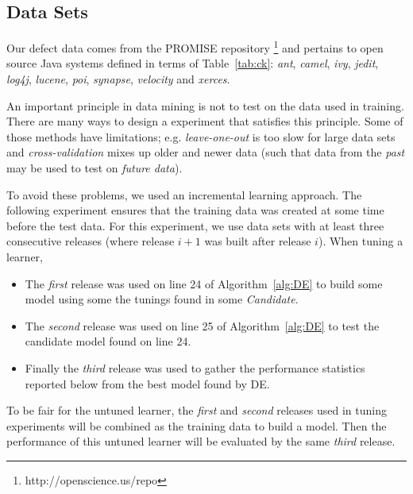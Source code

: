 \documentclass[smallextended]{svjour3}
\newcommand{\bi}{\begin{itemize}[leftmargin=0.4cm]}
\newcommand{\ei}{\end{itemize}}
\newcommand{\tab}[1]{Table~\ref{tab:#1}}
\begin{document}
\subsection{Data Sets}\label{sect:dataa}

Our defect data comes from the PROMISE repository \footnote{http://openscience.us/repo}
and pertains to 
open source Java systems defined in terms of \tab{ck}:  {\it ant}, {\it camel}, {\it ivy}, {\it jedit}, {\it log4j}, {\it lucene},
{\it poi}, {\it synapse}, {\it velocity} and {\it xerces}. 

An important principle in data mining is not to test on the data used
in training.  There are many ways to design a experiment that satisfies this principle.
Some of those methods have  limitations; e.g.
{\em leave-one-out} is too slow for large data sets and
{\em cross-validation} mixes up older and newer data  (such that
data from the {\em past} may be used to test on {\em future data}).

To avoid these problems, we used an incremental learning approach. The following
experiment ensures that the training data was created at some time before the test
data.
For this experiment, we use data sets with at least three  
consecutive releases  (where release $i+1$ was built after release $i$). When tuning a learner,
\bi 



\item The {\em first} release was used  on line 24 of Algorithm~\ref{alg:DE} to
   build some model using some the tunings found in some {\em Candidate}.
 \item The {\em second} release was used on line 25 of Algorithm~\ref{alg:DE} to 
   test the candidate model found on line 24.
   \item Finally the {\em third} release was used to gather the performance statistics
   reported below from the best model found by DE.
 \ei
 
 To be fair for the untuned learner, the {\em first} and {\em second} releases used in tuning experiments
 will be combined as the training data to build a model. Then the performance of this untuned learner 
 will be evaluated by the same {\em third} release.
 
\end{document}
